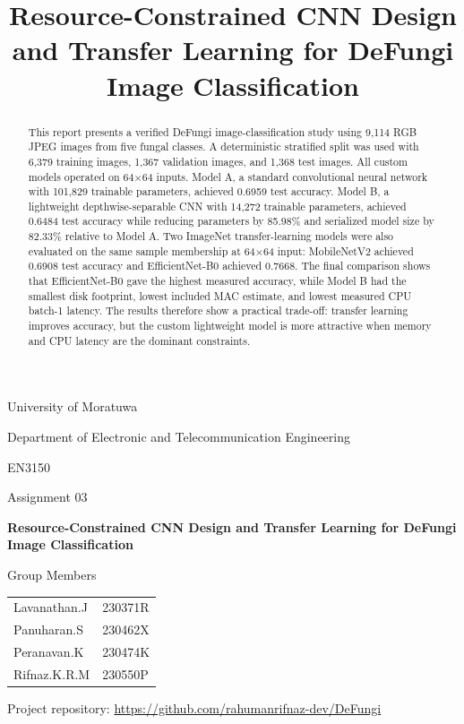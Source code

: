 \documentclass[11pt,a4paper]{article}
\title{Resource-Constrained CNN Design and Transfer Learning for DeFungi Image Classification}
\author{}
\date{}
\begin{document}
\begin{titlepage}
    \centering
    \vspace*{1.0cm}
    {\Large University of Moratuwa\par}
    \vspace{0.3cm}
    {\large Department of Electronic and Telecommunication Engineering\par}
    \vspace{1.2cm}
    {\large EN3150\par}
    \vspace{0.2cm}
    {\large Assignment 03\par}
    \vspace{1.4cm}
    {\LARGE\bfseries Resource-Constrained CNN Design and Transfer Learning for DeFungi Image Classification\par}
    \vspace{1.6cm}
    {\large Group Members\par}
    \vspace{0.4cm}
    \begin{tabular}{ll}
        Lavanathan.J & 230371R \\
        Panuharan.S & 230462X \\
        Peranavan.K & 230474K \\
        Rifnaz.K.R.M & 230550P \\
    \end{tabular}
    \vspace{0.8cm}

    {\small Project repository: \url{https://github.com/rahumanrifnaz-dev/DeFungi}\par}
    \vfill
\end{titlepage}

\tableofcontents
\clearpage
{}

\begin{abstract}
This report presents a verified DeFungi image-classification study using 9,114 RGB JPEG images from five fungal classes. A deterministic stratified split was used with 6,379 training images, 1,367 validation images, and 1,368 test images. All custom models operated on 64$\times$64 inputs. Model A, a standard convolutional neural network with 101,829 trainable parameters, achieved 0.6959 test accuracy. Model B, a lightweight depthwise-separable CNN with 14,272 trainable parameters, achieved 0.6484 test accuracy while reducing parameters by 85.98\% and serialized model size by 82.33\% relative to Model A. Two ImageNet transfer-learning models were also evaluated on the same sample membership at 64$\times$64 input: MobileNetV2 achieved 0.6908 test accuracy and EfficientNet-B0 achieved 0.7668. The final comparison shows that EfficientNet-B0 gave the highest measured accuracy, while Model B had the smallest disk footprint, lowest included MAC estimate, and lowest measured CPU batch-1 latency. The results therefore show a practical trade-off: transfer learning improves accuracy, but the custom lightweight model is more attractive when memory and CPU latency are the dominant constraints.
\end{abstract}
\end{document}
